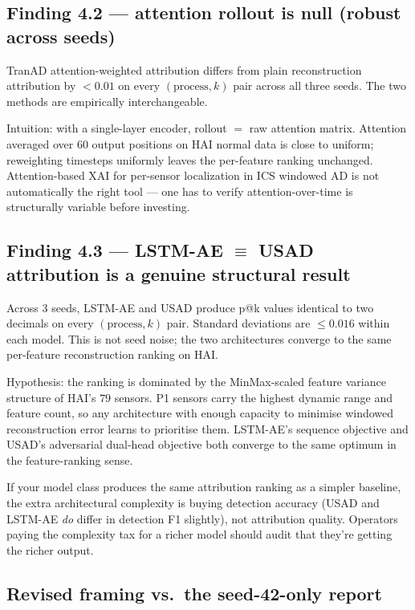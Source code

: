 \subsection{Finding 4.2 --- attention rollout is null (robust across seeds)}
\label{sec:finding-attn-null}

TranAD attention-weighted attribution differs from plain reconstruction attribution by $< 0.01$ on every $(\text{process}, k)$ pair across all three seeds.  The two methods are empirically interchangeable.

Intuition: with a single-layer encoder, rollout $=$ raw attention matrix.  Attention averaged over $60$ output positions on HAI normal data is close to uniform; reweighting timesteps uniformly leaves the per-feature ranking unchanged.  Attention-based XAI for per-sensor localization in ICS windowed AD is not automatically the right tool --- one has to verify attention-over-time is structurally variable before investing.

\subsection{Finding 4.3 --- LSTM-AE $\equiv$ USAD attribution is a genuine structural result}

Across $3$ seeds, LSTM-AE and USAD produce p@k values identical to two decimals on every $(\text{process}, k)$ pair.  Standard deviations are $\leq 0.016$ within each model.  This is not seed noise; the two architectures converge to the same per-feature reconstruction ranking on HAI.

Hypothesis: the ranking is dominated by the MinMax-scaled feature variance structure of HAI's $79$ sensors.  P1 sensors carry the highest dynamic range and feature count, so any architecture with enough capacity to minimise windowed reconstruction error learns to prioritise them.  LSTM-AE's sequence objective and USAD's adversarial dual-head objective both converge to the same optimum in the feature-ranking sense.

If your model class produces the same attribution ranking as a simpler baseline, the extra architectural complexity is buying detection accuracy (USAD and LSTM-AE \emph{do} differ in detection F1 slightly), not attribution quality.  Operators paying the complexity tax for a richer model should audit that they're getting the richer output.

\subsection{Revised framing vs.\ the seed-42-only report}

